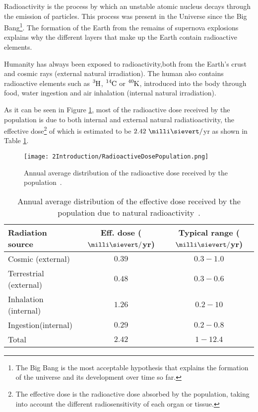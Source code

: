 Radioactivity is the process by which an unstable atomic nucleus decays through the emission of particles. This process was present in the Universe since the Big Bang\footnote{The Big Bang is the most acceptable hypothesis that explains the formation of the universe and its development over time so far.}. The formation of the Earth from the remains of supernova explosions explains why the different layers that make up the Earth contain radioactive elements. 

Humanity has always been exposed to radioactivity,both from the Earth's crust and cosmic rays (external natural irradiation). The human also contains radioactive elements such as $\ce{^{3}H}$, $\ce{^{14}C}$ or $\ce{^{40}K}$, introduced into the body through food, water ingestion and air inhalation (internal natural irradiation). %

As it can be seen in Figure \ref{fig:RadioactiveDosePopulation}, most of the radioactive dose received by the population is due to both internal and external natural radiatioactivity, the effective dose\footnote{The effective dose is the radioactive dose absorbed by the population, taking into account the different radiosensitivity of each organ or tissue.} of which is estimated to be $2.42~\milli\sievert/$yr as shown in Table \ref{tab:RadioactiveNaturalDosePopulation}. 

\begin{figure}[h]
\texttt{[image: 2Introduction/RadioactiveDosePopulation.png]}
\centering
\caption{Annual average distribution of the radioactive dose received by the population~\cite{IAEA}\label{fig:RadioactiveDosePopulation}.}
\end{figure}

\begin{table}[h]
\centering{}%
\begin{tabular}{lcc}
\toprule 
Radiation source & Eff. dose ($\milli\sievert/$yr) & Typical range ($\milli\sievert/$yr)\tabularnewline
\midrule
\midrule 
Cosmic (external) & $0.39$ & $0.3 - 1.0$ \tabularnewline
Terrestrial (external) & $0.48$ & $0.3-0.6$ \tabularnewline  
Inhalation (internal) & $1.26$ & $0.2-10$ \tabularnewline
Ingestion(internal) & $0.29$ & $0.2-0.8$ \tabularnewline
\midrule
Total & $2.42$ & $1-12.4$ \tabularnewline
\bottomrule
\end{tabular}
\caption{Annual average distribution of the effective dose received by the population due to natural radioactivity~\cite{UNSCEAR, CSN}.}
\label{tab:RadioactiveNaturalDosePopulation}
\end{table}

